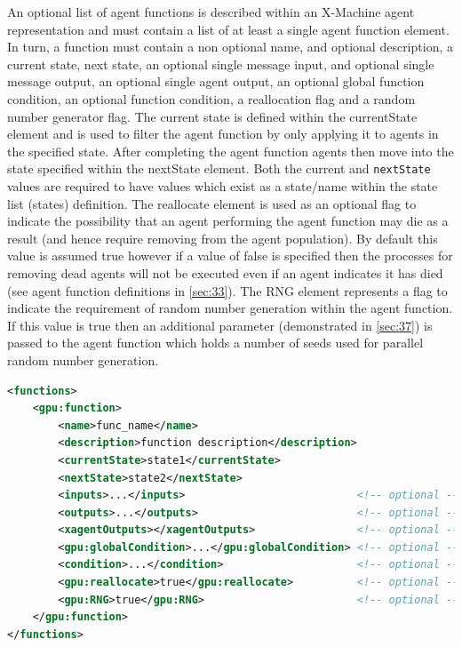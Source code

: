 \documentclass[11pt, a4paper, onecolumn, oneside]{report}
\begin{document}
An optional list of agent functions is described within an X-Machine agent representation and must contain a list of at least a single agent function element.
In turn, a function must contain a non optional name, and optional description, a current state, next state, an optional single message input, and optional single message output, an optional single agent output, an optional global function condition, an optional function condition, a reallocation flag and a random number generator flag.
The current state is defined within the currentState element and is used to filter the agent function by only applying it to agents in the specified state.
After completing the agent function agents then move into the state specified within the nextState element.
Both the current and \texttt{nextState} values are required to have values which exist as a state/name within the state list (states) definition.
The reallocate element is used as an optional flag to indicate the possibility that an agent performing the agent function may die as a result (and hence require removing from the agent population).
By default this value is assumed true however if a value of false is specified then the processes for removing dead agents will not be executed even if an agent indicates it has died (see agent function definitions in \cref{sec:33}).
The RNG element represents a flag to indicate the requirement of random number generation within the agent function.
If this value is true then an additional parameter (demonstrated in \cref{sec:37}) is passed to the agent function which holds a number of seeds used for parallel random number generation.


\begin{lstlisting}[language=XML]
<functions>
    <gpu:function>
        <name>func_name</name>
        <description>function description</description>
        <currentState>state1</currentState>
        <nextState>state2</nextState>
        <inputs>...</inputs>                           <!-- optional -->
        <outputs>...</outputs>                         <!-- optional -->
        <xagentOutputs></xagentOutputs>                <!-- optional -->
        <gpu:globalCondition>...</gpu:globalCondition> <!-- optional -->
        <condition>...</condition>                     <!-- optional -->
        <gpu:reallocate>true</gpu:reallocate>          <!-- optional -->
        <gpu:RNG>true</gpu:RNG>                        <!-- optional -->
    </gpu:function>
</functions>
\end{lstlisting}
\end{document}
